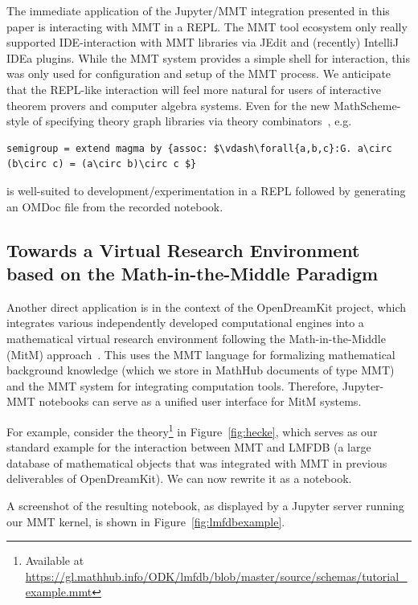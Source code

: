   The immediate application of the Jupyter/MMT integration presented in this paper is interacting with MMT in a REPL.
  The MMT tool ecosystem only really supported IDE-interaction with MMT libraries via JEdit and (recently) IntelliJ IDEa plugins. 
  While the MMT system provides a simple shell for interaction, this was only used for configuration and setup of the MMT process.
  We anticipate that the REPL-like interaction will feel more natural for users of interactive theorem provers and computer algebra systems.
  Even for the new MathScheme-style of specifying theory graph libraries via theory combinators~\cite{ShaRab:dcm19}, e.g. 
\begin{lstlisting}[mathescape]
semigroup = extend magma by {assoc: $\vdash\forall{a,b,c}:G. a\circ (b\circ c) = (a\circ b)\circ c $}
\end{lstlisting}
  is well-suited to development/experimentation in a REPL followed by generating an OMDoc file from the recorded notebook.

\subsection{Towards a Virtual Research Environment based on the Math-in-the-Middle Paradigm}


Another direct application is in the context of the OpenDreamKit project, which integrates various independently developed computational engines into a mathematical virtual research environment following the Math-in-the-Middle (MitM) approach~\cite{DehKohKon:iop16}.
This uses the MMT language for formalizing mathematical background knowledge (which we store in MathHub documents of type MMT) and the MMT system for integrating computation tools.
Therefore, Jupyter-MMT notebooks can serve as a unified user interface for MitM systems.

For example, consider the theory\footnote{Available at \url{https://gl.mathhub.info/ODK/lmfdb/blob/master/source/schemas/tutorial_example.mmt}}  in Figure~\ref{fig:hecke}, which serves as our standard example for the interaction between MMT and LMFDB (a large database of mathematical objects that was integrated with MMT in previous deliverables of OpenDreamKit).
We can now rewrite it as a notebook.

A screenshot of the resulting notebook, as displayed by a Jupyter server running our MMT kernel, is shown in Figure~\ref{fig:lmfdbexample}.

